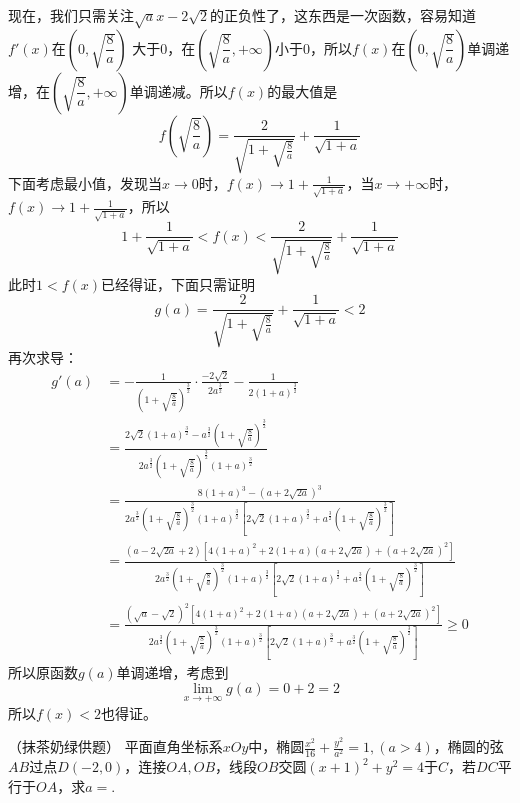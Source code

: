 \begin{solution}
现在，我们只需关注$\sqrt{a}x-2\sqrt2$的正负性了，这东西是一次函数，容易知道$f'(x)$在$(0,\sqrt{\dfrac{8}{a}})$
大于0，在$(\sqrt{\dfrac{8}{a}},+\infty)$小于0，所以$f(x)$在$(0,\sqrt{\dfrac{8}{a}})$单调递增，在$(\sqrt{\dfrac{8}{a}},+\infty)$单调递减。所以$f(x)$的最大值是\[f(\sqrt{\dfrac{8}{a}})=\frac{2}{\sqrt{1+\sqrt{\frac{8}{a}}}}+\frac{1}{\sqrt{1+a}}\]
下面考虑最小值，发现当$x\rightarrow 0$时，$f(x)\rightarrow 1+\frac{1}{\sqrt{1+a}}$，当$x\rightarrow +\infty$时，$f(x)\rightarrow 1+\frac{1}{\sqrt{1+a}}$，所以\[1+\frac{1}{\sqrt{1+a}}<f(x)<\frac{2}{\sqrt{1+\sqrt{\frac{8}{a}}}}+\frac{1}{\sqrt{1+a}}\]
此时$1<f(x)$已经得证，下面只需证明\[g(a)=\frac{2}{\sqrt{1+\sqrt{\frac{8}{a}}}}+\frac{1}{\sqrt{1+a}}<2\]
再次求导：
\begin{align*}g'(a)&=-\frac{1}{\left(1+\sqrt{\frac{8}{a}}\right)^{\frac{3}{2}}}\cdot\frac{-2\sqrt2}{2a^{\frac{3}{2}}}-\frac{1}{2(1+a)^{\frac{3}{2}}}\\&=\frac{2\sqrt{2}(1+a)^{\frac{3}{2}}-a^{\frac{3}{2}}\left(1+\sqrt{\frac{8}{a}}\right)^{\frac{3}{2}}}{2a^{\frac{3}{2}}\left(1+\sqrt{\frac{8}{a}}\right)^{\frac{3}{2}}(1+a)^{\frac{3}{2}}}\\&=\frac{8(1+a)^3-\left(a+2\sqrt{2a}\right)^3}{2a^{\frac{3}{2}}\left(1+\sqrt{\frac{8}{a}}\right)^{\frac{3}{2}}(1+a)^{\frac{3}{2}}\left[2\sqrt{2}(1+a)^{\frac{3}{2}}+a^{\frac{3}{2}}\left(1+\sqrt{\frac{8}{a}}\right)^{\frac{3}{2}}\right]}\\&=\frac{(a-2\sqrt{2a}+2)\left[4(1+a)^2+2(1+a)(a+2\sqrt{2a})+(a+2\sqrt{2a})^2\right]}{2a^{\frac{3}{2}}\left(1+\sqrt{\frac{8}{a}}\right)^{\frac{3}{2}}(1+a)^{\frac{3}{2}}\left[2\sqrt{2}(1+a)^{\frac{3}{2}}+a^{\frac{3}{2}}\left(1+\sqrt{\frac{8}{a}}\right)^{\frac{3}{2}}\right]}\\&=\frac{(\sqrt{a}-\sqrt{2})^2\left[4(1+a)^2+2(1+a)(a+2\sqrt{2a})+(a+2\sqrt{2a})^2\right]}{2a^{\frac{3}{2}}\left(1+\sqrt{\frac{8}{a}}\right)^{\frac{3}{2}}(1+a)^{\frac{3}{2}}\left[2\sqrt{2}(1+a)^{\frac{3}{2}}+a^{\frac{3}{2}}\left(1+\sqrt{\frac{8}{a}}\right)^{\frac{3}{2}}\right]}\geq0\end{align*}
所以原函数$g(a)$单调递增，考虑到\[\lim_{x\rightarrow +\infty}g(a)=0+2=2\]所以$f(x)<2$也得证。
\end{solution}
\newpage
\begin{example}{（抹茶奶绿供题）}{}
    平面直角坐标系$xOy$中，椭圆$\frac{x^2}{16}+\frac{y^2}{a^2}=1,(a>4)$，椭圆的弦$AB$过点$D(-2,0)$，连接$OA,OB$，线段$OB$交圆$(x+1)^2+y^2=4$于$C$，若$DC$平行于$OA$，求$a=$\underline{\hspace{1.2cm}}.
\end{example}
